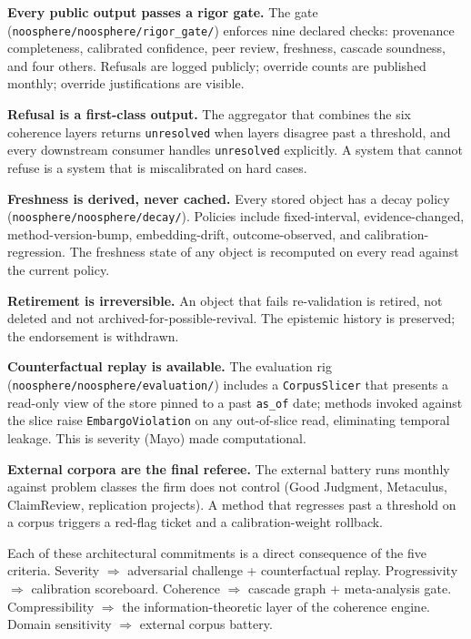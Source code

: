 \documentclass[11pt,letterpaper]{article}
\newcommand{\file}[1]{\texttt{#1}}
\begin{document}
\textbf{Every public output passes a rigor gate.} The gate (\file{noosphere/noosphere/rigor\_gate/}) enforces nine declared checks: provenance completeness, calibrated confidence, peer review, freshness, cascade soundness, and four others. Refusals are logged publicly; override counts are published monthly; override justifications are visible.

\textbf{Refusal is a first-class output.} The aggregator that combines the six coherence layers returns \texttt{unresolved} when layers disagree past a threshold, and every downstream consumer handles \texttt{unresolved} explicitly. A system that cannot refuse is a system that is miscalibrated on hard cases.

\textbf{Freshness is derived, never cached.} Every stored object has a decay policy (\file{noosphere/noosphere/decay/}). Policies include fixed-interval, evidence-changed, method-version-bump, embedding-drift, outcome-observed, and calibration-regression. The freshness state of any object is recomputed on every read against the current policy.

\textbf{Retirement is irreversible.} An object that fails re-validation is retired, not deleted and not archived-for-possible-revival. The epistemic history is preserved; the endorsement is withdrawn.

\textbf{Counterfactual replay is available.} The evaluation rig (\file{noosphere/noosphere/evaluation/}) includes a \texttt{CorpusSlicer} that presents a read-only view of the store pinned to a past \texttt{as\_of} date; methods invoked against the slice raise \texttt{EmbargoViolation} on any out-of-slice read, eliminating temporal leakage. This is severity (Mayo) made computational.

\textbf{External corpora are the final referee.} The external battery runs monthly against problem classes the firm does not control (Good Judgment, Metaculus, ClaimReview, replication projects). A method that regresses past a threshold on a corpus triggers a red-flag ticket and a calibration-weight rollback.

Each of these architectural commitments is a direct consequence of the five criteria. Severity $\Rightarrow$ adversarial challenge + counterfactual replay. Progressivity $\Rightarrow$ calibration scoreboard. Coherence $\Rightarrow$ cascade graph + meta-analysis gate. Compressibility $\Rightarrow$ the information-theoretic layer of the coherence engine. Domain sensitivity $\Rightarrow$ external corpus battery.
\end{document}
